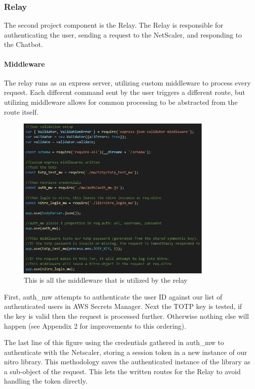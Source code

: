 \documentclass[onecolumn, draftclsnofoot,10pt, compsoc]{IEEEtran}
\begin{document}
\subsubsection{Relay}
    The second project component is the Relay.
    The Relay is responsible for authenticating the user, sending a request to the NetScaler, and responding to the Chatbot.
    
    \paragraph{Middleware}
    The relay runs as an express server, utilizing custom middleware to process every request.
    Each different command sent by the user triggers a different route, but utilizing middleware allows for common processing to be abstracted from the route itself.
    
    \begin{figure}[ht]
        \centering
        \includegraphics[height=8cm]{code7.png}
        \caption[Middleware for Relay]{This is all the middleware that is utilized by the relay}
        \label{fig:Middleware for Relay}
    \end{figure}
    
    First, auth\_mw attempts to authenticate the user ID against our list of authenticated users in AWS Secrets Manager.
    Next the TOTP key is tested, if the key is valid then the request is processed further.
    Otherwise nothing else will happen (see Appendix 2 for improvements to this ordering).
    
    The last line of this figure using the credentials gathered in auth\_mw to authenticate with the Netscaler, storing a session token in a new instance of our nitro library.
    This methodology saves the authenticated instance of the library as a sub-object of the request.
    This lets the written routes for the Relay to avoid handling the token directly.
    
\end{document}
